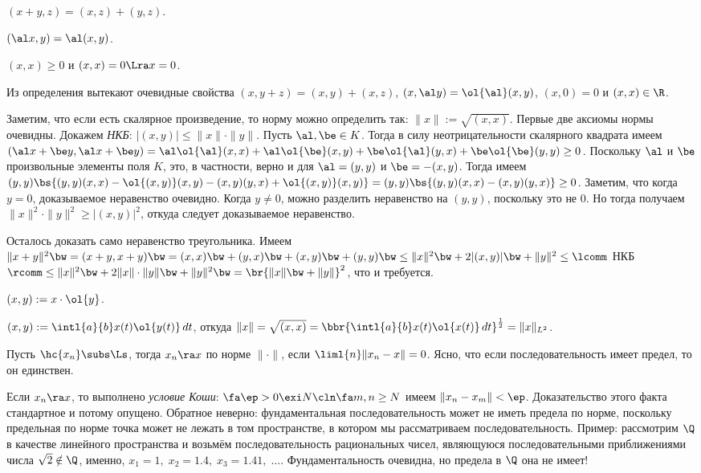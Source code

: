 \documentclass[a4paper]{article}
\newcommand{\intlab}{\intl{a}{b}}
\begin{document}
 $(x+y,z)=(x,z)+(y,z)$.

 $(\al x,y)=\al(x,y)$.

 $(x,x)\ge 0$ и $(x,x)=0 \Lra x = 0$.

Из определения вытекают очевидные свойства $(x,y+z)=(x,y)+(x,z)$, $(x, \al y) = \ol{\al}(x,y)$,
$(x,0)=0$ и $(x,x) \in \R$.

Заметим, что если есть скалярное произведение, то норму можно определить так:
$\|x\| := \sqrt{(x,x)}$. Первые две аксиомы нормы очевидны.
Докажем \emph{НКБ}: $|(x,y)| \le \|x\| \cdot \|y\|$. Пусть $\al, \be \in K$. Тогда в силу
неотрицательности скалярного квадрата имеем
$(\al x + \be y, \al x + \be y) = \al \ol{\al}(x,x) + \al \ol{\be}(x,y) + \be\ol{\al}(y,x) + \be \ol{\be}(y,y) \ge 0$.
Поскольку $\al$ и $\be$ произвольные элементы поля $K$, это, в частности, верно и
для $\al = (y,y)$ и $\be = -(x,y)$. Тогда имеем
$(y,y)\bs{(y,y)(x,x) - \ol{(x,y)}(x,y) - (x,y)(y,x) + \ol{(x,y)}(x,y)} = (y,y)\bs{(y,y)(x,x)-(x,y)(y,x)} \ge 0$.
Заметим, что когда $y = 0$, доказываемое неравенство очевидно. Когда $y \neq 0$, можно разделить
неравенство на $(y,y)$, поскольку это не 0. Но тогда получаем
$\|x\|^2\cdot\|y\|^2 \ge |(x,y)|^2$, откуда следует доказываемое неравенство.

Осталось доказать само неравенство треугольника. Имеем $\|x+y\|^2 \bw= (x+y,x+y) \bw= (x,x) \bw+ (y,x) \bw+ (x,y) \bw+
(y,y) \bw\le \|x\|^2 \bw+ 2|(x,y)| \bw+ \|y\|^2 \le \lcomm$ НКБ $\rcomm \le \|x\|^2 \bw+ 2\|x\|\cdot\|y\| \bw+ \|y\|^2 \bw=
\br{\|x\| \bw+ \|y\|}^2$, что и требуется.

\begin{ex}
 $(x,y) := x \cdot \ol{y}$.

 $(x,y) := \intlab x(t)\ol{y(t)}\,d t$, откуда $\|x\| = \sqrt{(x,x)} =
\bbr{\intlab x(t)\ol{x(t)}\,d t}^{\frac{1}{2}} = \|x\|_{L^2}$.
\end{ex}

\begin{df}
Пусть $\hc{x_n} \subs \Ls$, тогда $x_n \ra x$ по норме $\|\cdot\|$, если $\liml{n}\|x_n - x\| = 0$.
Ясно, что если последовательность имеет предел, то он единствен.
\end{df}

Если $x_n \ra x$, то выполнено \emph{условие Коши}: $\fa \ep > 0 \exi N\cln \fa m,n \ge N$
имеем $\|x_n - x_m\| < \ep$. Доказательство этого факта стандартное и потому опущено.
Обратное неверно: фундаментальная последовательность может не иметь предела
по норме, поскольку предельная по норме точка может не лежать в том пространстве, в
котором мы рассматриваем последовательность.
Пример: рассмотрим $\Q$ в качестве линейного пространства и возьмём последовательность
рациональных чисел, являющуюся последовательными приближениями числа $\sqrt{2} \notin \Q$,
именно, $x_1 = 1,\; x_2 = 1.4,\; x_3 = 1.41,\; \dots$.
Фундаментальность очевидна, но предела в $\Q$ она не имеет!
\end{document}
